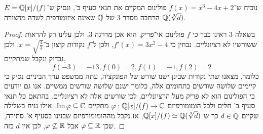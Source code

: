 \subquestion{}
נוכיח ש־$f(x) = x^3 - 4x + 2$ פולינום המקיים את תנאי סעיף ב', ונסיק ש־$E = \mathbb{Q}[x] / (f)$ הרחבה מסדר 3 של $\mathbb{Q}$ שאינה איזומורפית לשדה מהצורה $\mathbb{Q}(\sqrt[3]{d})$.
\begin{proof}
	בשאלה 3 ראינו כבר כי $f$ פולינום אי־פריק, הוא אכן מדרגה 3, ולכן עלינו רק להראות ששורשיו לא רציונליים.
	נבחין כי $f'(x) = 3x^2 - 4$, ולכן ל־$f$ נקודות קיצון ב־$x = \sqrt{\frac{4}{3}}$, ולכן נבדוק ונקבל שמתקיים,
	\[
		f(-3) = -13,
		f(0) = 2,
		f(1) = -1,
		f(2) = 2
	\]
	כלומר, מצאנו שתי נקודות שבינן ישנו שורש של הפונקציה, עתה ממשפט ערך הביניים נסיק כי קיימים שלושה שורשים בתחומים אלה, כלומר ישנם שלושה שורשים ממשיים.
	אנו גם יודעים כי הפולינום הוא לא פריק מעל הרציונליים, לכן שורשים אלה לא רציונליים.
	בהתאם כל תנאי סעיף ב' חלים ולכל הומומורפיזם $\varphi : \mathbb{Q}[x] / (f) \to \mathbb{C}$ מתקיים $\operatorname{Im} \varphi \subseteq \mathbb{C}$.
	אילו נניח בשלילה שקיים $d \in \mathbb{Q}$ כך ש־$\mathbb{Q}[x] / (f) \simeq \mathbb{Q}(\sqrt[3]{d})$, אז נקבל מההומומורפיזם שבנינו בסעיף א' סתירה, שכן $\varphi \subseteq \mathbb{R}$ אבל $\varphi \not\subseteq \mathbb{R}$, לכן אין $d$ כזה.
\end{proof}


